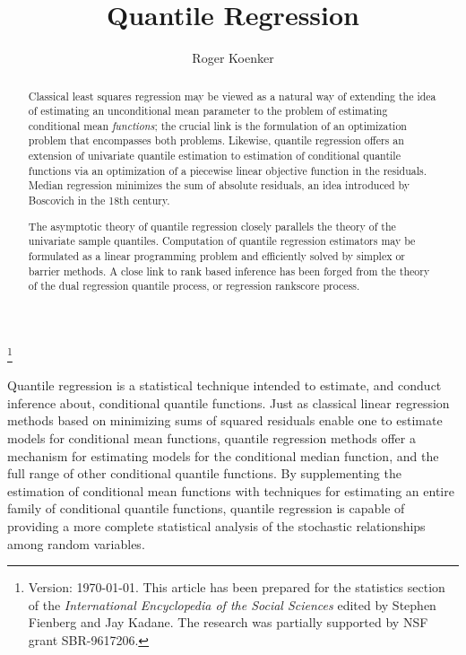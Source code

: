 \documentclass{amsart}
\begin{document}
\title{Quantile Regression }
\thanks{
Version: {\today}.
This article has been prepared for the statistics section of the
{\it International Encyclopedia of the Social Sciences}
edited by Stephen Fienberg and Jay Kadane.
The research was partially supported by NSF grant SBR-9617206.
}



\author{Roger Koenker}

\begin{abstract}
Classical least squares regression may be viewed as a
natural way of extending the idea of estimating an unconditional
mean parameter to the problem of estimating conditional mean {\it functions};
the crucial link is the formulation of an optimization problem
that encompasses both problems.  Likewise, quantile regression
offers an extension of univariate quantile estimation to estimation
of conditional quantile functions via an optimization of
a piecewise linear objective function in the residuals.  Median
regression minimizes the sum of absolute residuals, an idea introduced
by Boscovich in the 18th century.

The asymptotic theory of quantile regression closely parallels the
theory of the univariate sample quantiles. Computation
of quantile regression estimators may be formulated as a linear
programming problem and efficiently solved by simplex or
barrier methods.  A close link to rank based inference has been
forged from the theory of the dual regression quantile process,
or regression rankscore process.
\end{abstract}

\maketitle

Quantile regression is a statistical technique intended to estimate,
and conduct inference about, conditional quantile functions. 
Just as classical linear regression methods based on
minimizing sums of squared residuals enable one to estimate models for
conditional mean functions, quantile regression methods offer a mechanism
for estimating models for the conditional median function, and the full
range of other conditional quantile functions.
By supplementing the estimation of conditional mean functions with
techniques for estimating an entire family of conditional quantile
functions, quantile regression is capable of providing a more
complete statistical analysis of the stochastic relationships among
random variables.
\end{document}
